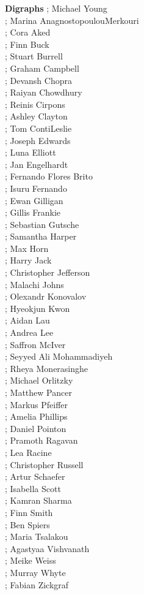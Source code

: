 \documentclass[a4paper,11pt]{report}
\newcommand{\maintitlesize}{\fontsize{50}{55}\selectfont}
\begin{document}
\begin{titlepage}
\begin{center}{\maintitlesize \textbf{ Digraphs \mbox{}}}
{   ;  Michael Young\\
    ;  Marina Anagnostopoulou\texttt{}Merkouri\\
  ;  Cora Aked\\
  ;  Finn Buck\\
  ;  Stuart Burrell\\
   ;  Graham Campbell\\
 ;  Devansh Chopra\\
  ;  Raiyan Chowdhury\\
 ;  Reinis Cirpons\\
  ;  Ashley Clayton\\
  ;  Tom Conti\texttt{}Leslie\\
   ;  Joseph Edwards\\
    ;  Luna Elliott\\
   ;  Jan Engelhardt\\
   ;  Fernando Flores Brito\\
  ;  Isuru Fernando\\
  ;  Ewan Gilligan\\
  ;  Gillis Frankie\\
  ;  Sebastian Gutsche\\
  ;  Samantha Harper\\
  ;  Max Horn\\
    ;  Harry Jack\\
  ;  Christopher Jefferson\\
    ;  Malachi Johns\\
  ;  Olexandr Konovalov\\
    ;  Hyeokjun Kwon\\
  ;  Aidan Lau\\
 ;  Andrea Lee\\
  ;  Saffron McIver\\
  ;  Seyyed Ali Mohammadiyeh\\
  ;  Rheya Monerasinghe\\
  ;  Michael Orlitzky\\
   ;  Matthew Pancer\\
  ;  Markus Pfeiffer\\
   ;  Amelia Phillips\\
  ;  Daniel Pointon\\
  ;  Pramoth Ragavan\\
  ;  Lea Racine\\
  ;  Christopher Russell\\
 ;  Artur Schaefer\\
  ;  Isabella Scott\\
  ;  Kamran Sharma\\
  ;  Finn Smith\\
   ;  Ben Spiers\\
  ;  Maria Tsalakou\\
   ;  Agastyaa Vishvanath\\
  ;  Meike Weiss\\
    ;  Murray Whyte\\
   ;  Fabian Zickgraf\\
  }
\end{center}\vfill


\end{titlepage}
\end{document}

